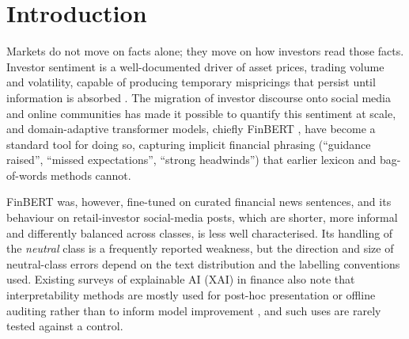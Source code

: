 \documentclass{aims}
\numberwithin{equation}{section}
\begin{document}

\maketitle
\linenumbers

\section{Introduction}
Markets do not move on facts alone; they move on how investors read those facts.
Investor sentiment is a well-documented driver of asset prices, trading volume and
volatility, capable of producing temporary mispricings that persist until
information is absorbed \citep{tetlock2007,baker2006}. The migration of investor
discourse onto social media and online communities has made it possible to
quantify this sentiment at scale, and domain-adaptive transformer models, chiefly
FinBERT \citep{araci2019}, have become a standard tool for doing so, capturing
implicit financial phrasing (``guidance raised'', ``missed expectations'', ``strong
headwinds'') that earlier lexicon and bag-of-words methods cannot.

FinBERT was, however, fine-tuned on curated financial news sentences, and its
behaviour on retail-investor social-media posts, which are shorter, more informal
and differently balanced across classes, is less well characterised. Its handling
of the \emph{neutral} class is a frequently reported weakness, but the direction
and size of neutral-class errors depend on the text distribution and the labelling
conventions used. Existing surveys of explainable AI (XAI) in finance also note
that interpretability methods are mostly used for post-hoc presentation or offline
auditing rather than to inform model improvement \citep{yeo2025}, and such uses are
rarely tested against a control.
\end{document}
